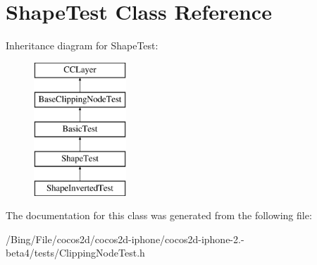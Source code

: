 \hypertarget{interface_shape_test}{\section{Shape\-Test Class Reference}
\label{interface_shape_test}
}
Inheritance diagram for Shape\-Test\-:\begin{figure}[H]
\begin{center}
\leavevmode
\includegraphics[height=5.000000cm]{interface_shape_test}
\end{center}
\end{figure}


The documentation for this class was generated from the following file\-:\begin{DoxyCompactItemize}
\item 
/\-Bing/\-File/cocos2d/cocos2d-\/iphone/cocos2d-\/iphone-\/2.-\/beta4/tests/Clipping\-Node\-Test.\-h\end{DoxyCompactItemize}
